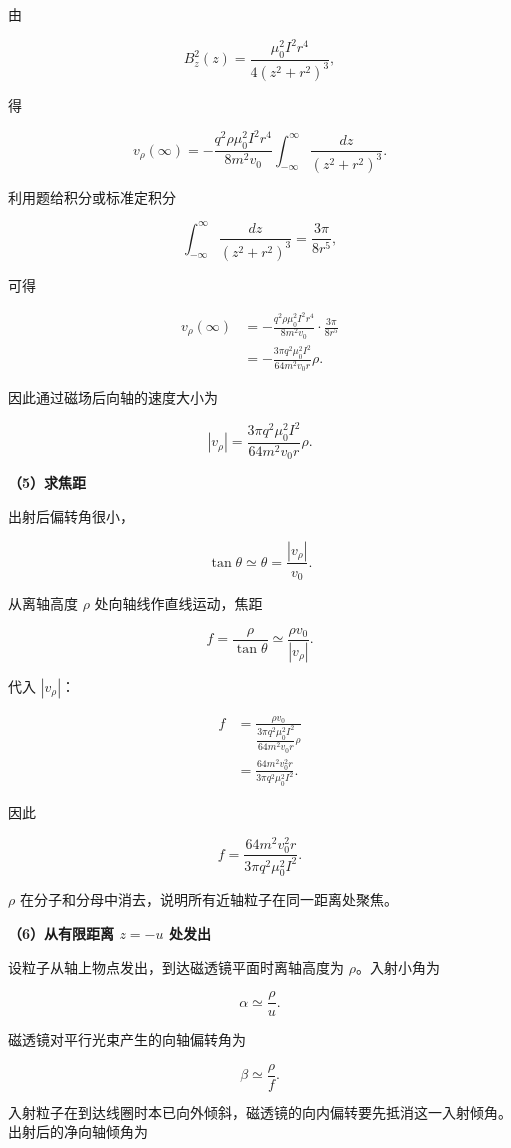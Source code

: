 \documentclass[12pt,a4paper,UTF8]{ctexart}
\begin{document}
由

\[
B_z^2(z)=\frac{\mu_0^2I^2r^4}{4(z^2+r^2)^3},
\]

得

\[
v_\rho(\infty)
=-\frac{q^2\rho\mu_0^2I^2r^4}{8m^2v_0}
\int_{-\infty}^{\infty}\frac{dz}{(z^2+r^2)^3}.
\]

利用题给积分或标准定积分

\[
\int_{-\infty}^{\infty}\frac{dz}{(z^2+r^2)^3}
=\frac{3\pi}{8r^5},
\]

可得

\[
\begin{aligned}
v_\rho(\infty)
&=-\frac{q^2\rho\mu_0^2I^2r^4}{8m^2v_0}
\cdot\frac{3\pi}{8r^5}\\
&=-\frac{3\pi q^2\mu_0^2I^2}{64m^2v_0r}\rho.
\end{aligned}
\]

因此通过磁场后向轴的速度大小为

\[
\boxed{|v_\rho|=\frac{3\pi q^2\mu_0^2I^2}{64m^2v_0r}\rho}.
\]

\textbf{（5）求焦距}

出射后偏转角很小，

\[
\tan\theta\simeq\theta=\frac{|v_\rho|}{v_0}.
\]

从离轴高度 \(\rho\) 处向轴线作直线运动，焦距

\[
f=\frac{\rho}{\tan\theta}
\simeq\frac{\rho v_0}{|v_\rho|}.
\]

代入 \(|v_\rho|\)：

\[
\begin{aligned}
f
&=\frac{\rho v_0}
{\dfrac{3\pi q^2\mu_0^2I^2}{64m^2v_0r}\rho}\\
&=\frac{64m^2v_0^2r}{3\pi q^2\mu_0^2I^2}.
\end{aligned}
\]

因此

\[
\boxed{f=\frac{64m^2v_0^2r}{3\pi q^2\mu_0^2I^2}}.
\]

\(\rho\) 在分子和分母中消去，说明所有近轴粒子在同一距离处聚焦。

\textbf{（6）从有限距离 \(z=-u\) 处发出}

设粒子从轴上物点发出，到达磁透镜平面时离轴高度为 \(\rho\)。入射小角为

\[
\alpha\simeq\frac{\rho}{u}.
\]

磁透镜对平行光束产生的向轴偏转角为

\[
\beta\simeq\frac{\rho}{f}.
\]

入射粒子在到达线圈时本已向外倾斜，磁透镜的向内偏转要先抵消这一入射倾角。出射后的净向轴倾角为
\end{document}
